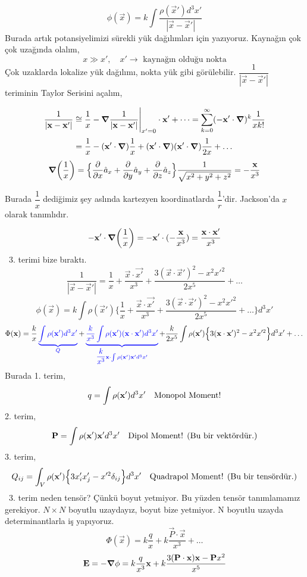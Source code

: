 \begin{theorem}
\[ \phi (\Vec{x}) = k \int \dfrac{\rho (\Vec{x}')  d^{3} x'}{|\Vec{x} - \Vec{x}'|}  \]
Burada artık potansiyelimizi sürekli yük dağılımları için yazıyoruz. Kaynağın çok çok uzağında olalım,
\[ x \gg x', \quad x'\rightarrow \textrm{ kaynağın olduğu nokta} \]
Çok uzaklarda lokalize yük dağılımı, nokta yük gibi görülebilir. $\dfrac{1}{|\Vec{x} - \Vec{x}'|}$
teriminin Taylor Serisini açalım,

\[\dfrac{1}{|\Vec{x} - \Vec{x}'|}  \cong \dfrac{1}{x} - \grad \dfrac{1}{|\Vec{x} - \Vec{x}'|} \Bigg|_{x'=0} \cdot \Vec{x}' + \dots = \sum_{k=0}^{\infty} (-\Vec{x}' \cdot \grad)^{k} \dfrac{1}{xk!} \]
\[ = \dfrac{1}{x} - (\Vec{x}' \cdot \grad) \dfrac{1}{x} + (\Vec{x}' \cdot \grad) (\Vec{x}' \cdot \grad)  \dfrac{1}{2x} + \dots \]
\[ \grad (\dfrac{1}{x}) = \Big\{ \dfrac{\partial}{\partial x} \hat{a}_{x} + \dfrac{\partial}{\partial y} \hat{a}_{y} + \dfrac{\partial}{\partial z} \hat{a}_{z} \Big\} \dfrac{1}{\sqrt{x^{2} + y^{2} + z^{2}}} = - \dfrac{\Vec{x}}{x^{3}}  \]
\begin{notation}
    Burada $\dfrac{1}{x}$ dediğimiz şey aslında kartezyen koordinatlarda $\dfrac{1}{r}$'dir. Jackson'da $x$ olarak tanımlıdır.
\end{notation}
\[ -\Vec{x}' \cdot \grad (\dfrac{1}{x}) = - \Vec{x}' \cdot (-\dfrac{\Vec{x}}{x^{3}}) = \dfrac{\Vec{x} \cdot \Vec{x'}}{x^{3}} \]
\dangersign \ 3. terimi bize bıraktı.
\[ \dfrac{1}{|\Vec{x} - \Vec{x}'|} = \dfrac{1}{x} + \dfrac{\Vec{x} \cdot \Vec{x'}}{x^{3}} + \dfrac{3 (\Vec{x} \cdot \Vec{x}')^{2}-x^{2}x'^{2}}{2x^{5}} + \dots \]
\[ \phi (\Vec{x}) = k \int \rho (\Vec{x}') \Big\{ \dfrac{1}{x} + \dfrac{\Vec{x} \cdot \Vec{x'}}{x^{3}} + \dfrac{3 (\Vec{x} \cdot \Vec{x}')^{2}-x^{2}x'^{2}}{2x^{5}} + \dots \Big\} d^{3}x' \]
\[\Phi (\Vec{x}) = \dfrac{k}{x}   \begingroup \color{blue}\underbrace{\int \rho (\Vec{x}')  d^{3}x'}_{Q} \endgroup +   \begingroup \color{blue}\underbrace{ \dfrac{k}{x^{3}} \int \rho(\Vec{x}') (\Vec{x} \cdot \Vec{x}') d^{3}x'}_{\dfrac{k}{x^{3}} \Vec{x} \cdot \int \rho (\Vec{x}') \Vec{x'} d^{3}x'} \endgroup + \dfrac{k}{2x^{5}}  \int \rho(\Vec{x}') \Big\{ 3 (\Vec{x} \cdot \Vec{x}')^{2} - x^{2}x'^{2} \Big\}  d^{3}x' + \dots \]
Burada 1. terim,
\[ q = \int \rho (\Vec{x}')d^{3}x' \textrm{\quad Monopol Moment!} \]
2. terim,
\[ \Vec{P} = \int \rho (\Vec{x}') \Vec{x'} d^{3}x' \textrm{\quad Dipol Moment! (Bu bir vektördür.)} \]
3. terim,
\[ Q_{ij} = \int_{V} \rho(\Vec{x'}) \Big\{ 3 x_{i}'x_{j}' - x'^{2} \delta_{ij} \Big\}  d^{3}x' \textrm{\quad Quadrapol Moment! (Bu bir tensördür.)} \]
\dangersign \ 3. terim neden tensör? Çünkü boyut yetmiyor. Bu yüzden tensör tanımlamamız gerekiyor. $N \times N$ boyutlu uzaydayız, boyut bize yetmiyor. N boyutlu uzayda determinantlarla iş yapıyoruz.
\[ \Phi (\Vec{x}) = k \dfrac{q}{x} + k \dfrac{\vec{P} \cdot \Vec{x}}{x^{3}} + \dots \]
\[ \Vec{E} = - \grad \phi = k \dfrac{q}{x^{3}} \Vec{x} + k \dfrac{ 3 (\vec{P} \cdot \Vec{x})\Vec{x} - \Vec{P} x^{2} }{x^{5}} \]


\end{theorem}
